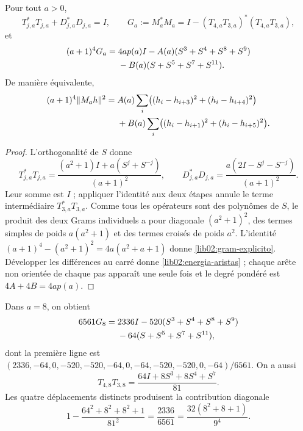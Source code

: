 \begin{proposition}
\label{lib02:gram}
Pour tout \(a>0\),
\[
 T_{j,a}^*T_{j,a}+D_{j,a}^*D_{j,a}=I,\qquad
 G_a:=M_a^*M_a=I-(T_{4,a}T_{3,a})^*(T_{4,a}T_{3,a}),
\]
et
\begin{align}
 (a+1)^4G_a={}&4ap(a)I
 -A(a)(S^3+S^4+S^8+S^9)\notag\\
 &-B(a)(S+S^5+S^7+S^{11}).
 \label{lib02:gram-explicito}
\end{align}
De manière équivalente,
\begin{align}
 (a+1)^4\|M_ah\|^2={}&A(a)\sum_i
 \bigl((h_i-h_{i+3})^2+(h_i-h_{i+4})^2\bigr)\notag\\
 &+B(a)\sum_i
 \bigl((h_i-h_{i+1})^2+(h_i-h_{i+5})^2\bigr).
 \label{lib02:energia-aristas}
\end{align}
\end{proposition}
\begin{proof}
L'orthogonalité de \(S\) donne
\[
 T_{j,a}^*T_{j,a}
 =\frac{(a^2+1)I+a(S^j+S^{-j})}{(a+1)^2},\qquad
 D_{j,a}^*D_{j,a}
 =\frac{a(2I-S^j-S^{-j})}{(a+1)^2}.
\]
Leur somme est \(I\) ; appliquer l’identité aux deux étapes annule le
terme intermédiaire \(T_{3,a}^*T_{3,a}\). Comme tous les opérateurs
sont des polynômes de \(S\), le produit des deux Grams individuels
a pour diagonale \((a^2+1)^2\), des termes simples de poids
\(a(a^2+1)\) et des termes croisés de poids \(a^2\). L’identité
\((a+1)^4-(a^2+1)^2=4a(a^2+a+1)\) donne
\eqref{lib02:gram-explicito}. Développer les différences au carré donne
\eqref{lib02:energia-aristas} ; chaque arête non orientée de chaque pas
apparaît une seule fois et le degré pondéré est \(4A+4B=4ap(a)\).
\end{proof}

Dans \(a=8\), on obtient
\begin{align}
 6561G_8={}&2336I-520(S^3+S^4+S^8+S^9)\notag\\
 &-64(S+S^5+S^7+S^{11}),
 \label{lib02:gram-nonadico}
\end{align}
dont la première ligne est
\((2336,-64,0,-520,-520,-64,0,-64,-520,-520,0,-64)/6561\).
On a aussi
\[
 T_{4,8}T_{3,8}=\frac{64I+8S^3+8S^4+S^7}{81}.
\]
Les quatre déplacements distincts produisent la contribution diagonale
\[
 1-\frac{64^2+8^2+8^2+1}{81^2}
 =\frac{2336}{6561}
 =\frac{32(8^2+8+1)}{9^4}.
\]

